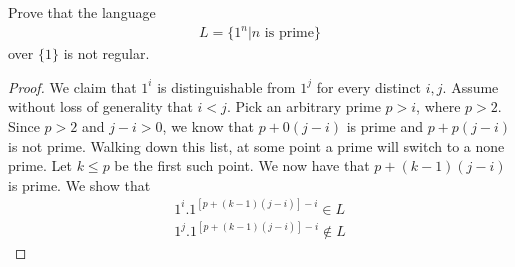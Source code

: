\documentclass[a4paper]{article}
\theoremstyle{plain}
\theoremstyle{definition}
\newtheorem{exmp}{Example}[section]
\theoremstyle{remark}
\begin{document}
\begin{tcolorbox}[colback=black!3!white,colframe=black!60!white,title=\begin{exmp}Myhill-Nerode Example Three \label{Myhill-Nerode Example Three}\end{exmp}]
        Prove that the language
                \begin{align}
                L= \{1^{n} | n \text{ is prime} \}	
                \end{align}
		over $\{1\}$ is not regular.
		\begin{proof}
			We claim that $1^{i}$ is distinguishable from $1^{j}$ for every distinct $i,j$. Assume without loss of generality that $i<j$. Pick an arbitrary prime $p>i$, where $p>2$. Since $p>2$ and $j-i > 0$, we know that $p + 0(j-i)$ is prime and $p+p(j-i)$ is not prime. Walking down this list, at some point a prime will switch to a none prime. Let $k \le p$ be the first such point. We now have that $p+(k-1)(j-i)$ is prime. We show that
			\begin{align}
				1^{i}.1^{[p+(k-1)(j-i)]-i} \in L \\
				1^{j}.1^{[p+(k-1)(j-i)]-i}\not\in L
			\end{align}
		\end{proof}
\end{tcolorbox}
\end{document}
